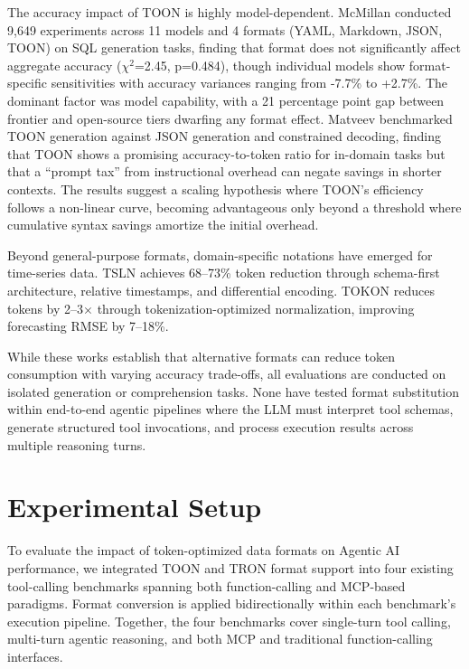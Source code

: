 \documentclass[11pt]{article}
\begin{document}
The accuracy impact of TOON is highly model-dependent. McMillan \citep{McMillan_2026} conducted 9,649 experiments across 11 models and 4 formats (YAML, Markdown, JSON, TOON) on SQL generation tasks, finding that format does not significantly affect aggregate accuracy ($\chi^2$=2.45, p=0.484), though individual models show format-specific sensitivities with accuracy variances ranging from -7.7\% to +2.7\%. The dominant factor was model capability, with a 21 percentage point gap between frontier and open-source tiers dwarfing any format effect. Matveev \citep{Matveev_2026} benchmarked TOON generation against JSON generation and constrained decoding, finding that TOON shows a promising accuracy-to-token ratio for in-domain tasks but that a ``prompt tax'' from instructional overhead can negate savings in shorter contexts. The results suggest a scaling hypothesis where TOON's efficiency follows a non-linear curve, becoming advantageous only beyond a threshold where cumulative syntax savings amortize the initial overhead.

Beyond general-purpose formats, domain-specific notations have emerged for time-series data. TSLN \citep{Mudbari_Bhagat_2026} achieves 68--73\% token reduction through schema-first architecture, relative timestamps, and differential encoding. TOKON \citep{Yang_2025} reduces tokens by 2--3$\times$ through tokenization-optimized normalization, improving forecasting RMSE by 7--18\%.

While these works establish that alternative formats can reduce token consumption with varying accuracy trade-offs, all evaluations are conducted on isolated generation or comprehension tasks. None have tested format substitution within end-to-end agentic pipelines where the LLM must interpret tool schemas, generate structured tool invocations, and process execution results across multiple reasoning turns.

\section{Experimental Setup}
\label{sec:experimental_setup}

To evaluate the impact of token-optimized data formats on Agentic AI performance, we integrated TOON and TRON format support into four existing tool-calling benchmarks spanning both function-calling and MCP-based paradigms. Format conversion is applied bidirectionally within each benchmark's execution pipeline. Together, the four benchmarks cover single-turn tool calling, multi-turn agentic reasoning, and both MCP and traditional function-calling interfaces.
\end{document}

